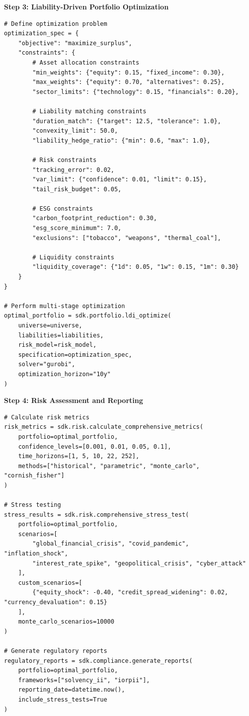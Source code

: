 \documentclass[12pt,a4paper]{article}
\theoremstyle{definition}
\theoremstyle{remark}
\begin{document}
\textbf{Step 3: Liability-Driven Portfolio Optimization}
\begin{lstlisting}[caption=LDI Optimization]
# Define optimization problem
optimization_spec = {
    "objective": "maximize_surplus",
    "constraints": {
        # Asset allocation constraints
        "min_weights": {"equity": 0.15, "fixed_income": 0.30},
        "max_weights": {"equity": 0.70, "alternatives": 0.25},
        "sector_limits": {"technology": 0.15, "financials": 0.20},
        
        # Liability matching constraints
        "duration_match": {"target": 12.5, "tolerance": 1.0},
        "convexity_limit": 50.0,
        "liability_hedge_ratio": {"min": 0.6, "max": 1.0},
        
        # Risk constraints
        "tracking_error": 0.02,
        "var_limit": {"confidence": 0.01, "limit": 0.15},
        "tail_risk_budget": 0.05,
        
        # ESG constraints
        "carbon_footprint_reduction": 0.30,
        "esg_score_minimum": 7.0,
        "exclusions": ["tobacco", "weapons", "thermal_coal"],
        
        # Liquidity constraints
        "liquidity_coverage": {"1d": 0.05, "1w": 0.15, "1m": 0.30}
    }
}

# Perform multi-stage optimization
optimal_portfolio = sdk.portfolio.ldi_optimize(
    universe=universe,
    liabilities=liabilities,
    risk_model=risk_model,
    specification=optimization_spec,
    solver="gurobi",
    optimization_horizon="10y"
)
\end{lstlisting}

\textbf{Step 4: Risk Assessment and Reporting}
\begin{lstlisting}[caption=Comprehensive Risk Analysis]
# Calculate risk metrics
risk_metrics = sdk.risk.calculate_comprehensive_metrics(
    portfolio=optimal_portfolio,
    confidence_levels=[0.001, 0.01, 0.05, 0.1],
    time_horizons=[1, 5, 10, 22, 252],
    methods=["historical", "parametric", "monte_carlo", "cornish_fisher"]
)

# Stress testing
stress_results = sdk.risk.comprehensive_stress_test(
    portfolio=optimal_portfolio,
    scenarios=[
        "global_financial_crisis", "covid_pandemic", "inflation_shock",
        "interest_rate_spike", "geopolitical_crisis", "cyber_attack"
    ],
    custom_scenarios=[
        {"equity_shock": -0.40, "credit_spread_widening": 0.02, "currency_devaluation": 0.15}
    ],
    monte_carlo_scenarios=10000
)

# Generate regulatory reports
regulatory_reports = sdk.compliance.generate_reports(
    portfolio=optimal_portfolio,
    frameworks=["solvency_ii", "iorpii"],
    reporting_date=datetime.now(),
    include_stress_tests=True
)
\end{lstlisting}
\end{document}
